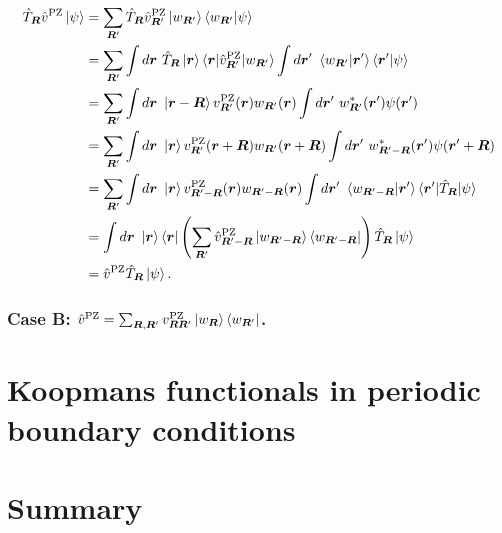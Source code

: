 \begin{equation}
    \begin{split}
        \hat{T}_{{\bm R}} \hat{v}^{\rm PZ} \ket{\psi} &= \sum_{{\bm R}'} \hat{T}_{{\bm R}} \hat{v}^{\rm PZ}_{{\bm R}'} \ket{w_{{\bm R}'}} \braket{w_{{\bm R}'}|\psi} \\
        &= \sum_{{\bm R}'} \int d{\bm r} \ \hat{T}_{{\bm R}} \ket{{\bm r}} \braket{{\bm r}|\hat{v}^{\rm PZ}_{{\bm R}'}|w_{{\bm R}'}} \int d{\bm r}' \ \braket{w_{{\bm R}'}|{\bm r}'} \braket{{\bm r}'|\psi} \\
        &= \sum_{{\bm R}'} \int d{\bm r} \ \ket{{\bm r} - {\bm R}} v^{\rm PZ}_{{\bm R}'}({\bm r}) w_{{\bm R}'}({\bm r}) \int d{\bm r}' \ w_{{\bm R}'}^*({\bm r}') \psi({\bm r}') \\
        &= \sum_{{\bm R}'} \int d{\bm r} \ \ket{{\bm r}} v^{\rm PZ}_{{\bm R}'}({\bm r} + {\bm R}) w_{{\bm R}'}({\bm r} + {\bm R}) \int d{\bm r}' \ w_{{\bm R}' - {\bm R}}^*({\bm r}') \psi({\bm r}' + {\bm R}) \\
        &= \sum_{{\bm R}'} \int d{\bm r} \ \ket{{\bm r}} v^{\rm PZ}_{{\bm R}' - {\bm R}}({\bm r}) w_{{\bm R}' - {\bm R}}({\bm r}) \int d{\bm r}' \ \braket{w_{{\bm R}' - {\bm R}}|{\bm r}'} \braket{{\bm r}'|\hat{T}_{{\bm R}}|\psi} \\
        &= \int d{\bm r} \ \ket{{\bm r}} \bra{{\bm r}} \left( \sum_{{\bm R}'} \hat{v}^{\rm PZ}_{{\bm R}' - {\bm R}} \ket{w_{{\bm R}' - {\bm R}}} \bra{w_{{\bm R}' - {\bm R}}} \right) \hat{T}_{{\bm R}} \ket{\psi} \\
        &= \hat{v}^{\rm PZ} \hat{T}_{{\bm R}} \ket{\psi} .
    \end{split}
\end{equation}

\subsubsection*{Case B: $\hat{v}^{\rm PZ} = \sum_{{\bm R}, {\bm R}'} v^{\rm PZ}_{{\bm R} {\bm R}'} \ket{w_{{\bm R}}} \bra{w_{{\bm R}'}}$.}



\section{Koopmans functionals in periodic boundary conditions\label{sec:koopmans-pbc}}

\section{Summary\label{sec:ch4-summary}}

